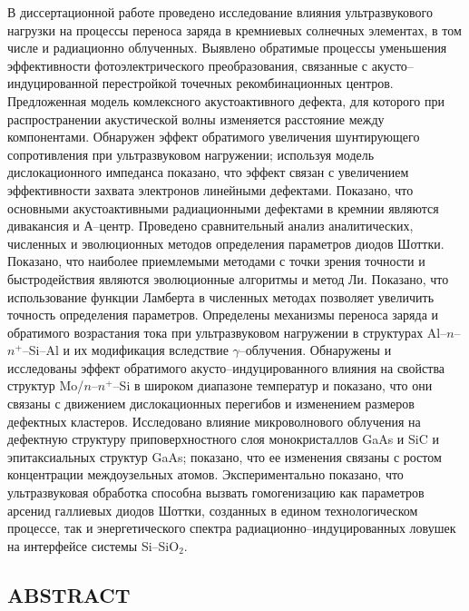 В диссертационной работе проведено исследование влияния ультразвукового нагрузки на процессы переноса заряда в кремниевых солнечных элементах,
 в том числе и радиационно облученных.
 Выявлено обратимые процессы уменьшения эффективности фотоэлектрического преобразования,
 связанные с акусто--индуцированной перестройкой точечных рекомбинационных центров.
  Предложенная модель комлексного акустоактивного дефекта, для которого при распространении акустической волны изменяется расстояние между компонентами.
 Обнаружен эффект обратимого увеличения шунтирующего сопротивления при ультразвуковом нагружении;
используя модель дислокационного импеданса показано, что эффект связан с увеличением эффективности захвата электронов линейными дефектами.
 Показано, что основными акустоактивными радиационными дефектами в кремнии являются дивакансия и А--центр.
 Проведено сравнительный анализ аналитических, численных и эволюционных методов определения параметров диодов Шоттки.
 Показано, что наиболее приемлемыми методами с точки зрения точности и быстродействия являются эволюционные алгоритмы и метод Ли.
 Показано, что использование функции Ламберта в численных методах позволяет увеличить точность определения параметров.
 Определены механизмы переноса заряда и обратимого возрастания тока при ультразвуковом нагружении
 в структурах Al--$n$--$n^+$--Si--Al и их модификация вследствие $\gamma$--облучения.
 Обнаружены и исследованы эффект обратимого акусто--индуцированного влияния на свойства структур Mo/$n$--$n^{+}$--Si в широком диапазоне температур
 и показано, что они связаны с движением дислокационных перегибов и изменением размеров дефектных кластеров.
 Исследовано влияние микроволнового облучения на дефектную структуру приповерхностного слоя монокристаллов GaAs и SiC и эпитаксиальных структур GaAs;
 показано,  что ее изменения связаны с ростом концентрации междоузельных атомов.
 Экспериментально показано, что ультразвуковая обработка способна вызвать гомогенизацию как параметров арсенид галлиевых диодов Шоттки, созданных в едином технологическом процессе, так и энергетического спектра радиационно--индуцированных ловушек на интерфейсе системы Si--SiO$_2$.


\keywordsRu


\begin{center}
{\section*{\MakeUppercase{ABSTRACT}}}
\end{center}

